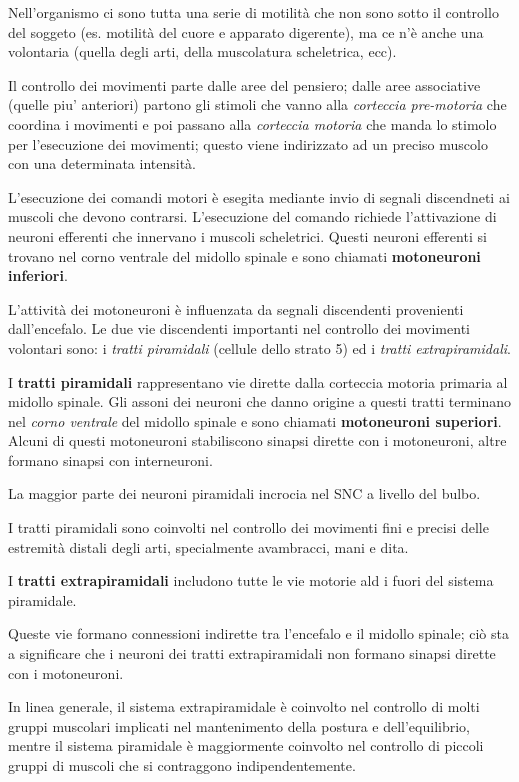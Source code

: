 \documentclass[]{article}
\begin{document}
Nell'organismo ci sono tutta una serie di motilità che non sono sotto il
controllo del soggeto (es. motilità del cuore e apparato digerente), ma
ce n'è anche una volontaria (quella degli arti, della muscolatura
scheletrica, ecc).

Il controllo dei movimenti parte dalle aree del pensiero; dalle aree
associative (quelle piu' anteriori) partono gli stimoli che vanno alla
\emph{corteccia pre-motoria} che coordina i movimenti e poi passano alla
\emph{corteccia motoria} che manda lo stimolo per l'esecuzione dei
movimenti; questo viene indirizzato ad un preciso muscolo con una
determinata intensità.

L'esecuzione dei comandi motori è esegita mediante invio di segnali
discendneti ai muscoli che devono contrarsi. L'esecuzione del comando
richiede l'attivazione di neuroni efferenti che innervano i muscoli
scheletrici. Questi neuroni efferenti si trovano nel corno ventrale del
midollo spinale e sono chiamati \textbf{motoneuroni inferiori}.

L'attività dei motoneuroni è influenzata da segnali discendenti
provenienti dall'encefalo. Le due vie discendenti importanti nel
controllo dei movimenti volontari sono: i \emph{tratti piramidali}
(cellule dello strato 5) ed i \emph{tratti extrapiramidali}.

I \textbf{tratti piramidali} rappresentano vie dirette dalla corteccia
motoria primaria al midollo spinale. Gli assoni dei neuroni che danno
origine a questi tratti terminano nel \emph{corno ventrale} del midollo
spinale e sono chiamati \textbf{motoneuroni superiori}. Alcuni di questi
motoneuroni stabiliscono sinapsi dirette con i motoneuroni, altre
formano sinapsi con interneuroni.

La maggior parte dei neuroni piramidali incrocia nel SNC a livello del
bulbo.

I tratti piramidali sono coinvolti nel controllo dei movimenti fini e
precisi delle estremità distali degli arti, specialmente avambracci,
mani e dita.

I \textbf{tratti extrapiramidali} includono tutte le vie motorie ald i
fuori del sistema piramidale.

Queste vie formano connessioni indirette tra l'encefalo e il midollo
spinale; ciò sta a significare che i neuroni dei tratti extrapiramidali
non formano sinapsi dirette con i motoneuroni.

In linea generale, il sistema extrapiramidale è coinvolto nel controllo
di molti gruppi muscolari implicati nel mantenimento della postura e
dell'equilibrio, mentre il sistema piramidale è maggiormente coinvolto
nel controllo di piccoli gruppi di muscoli che si contraggono
indipendentemente.
\end{document}
